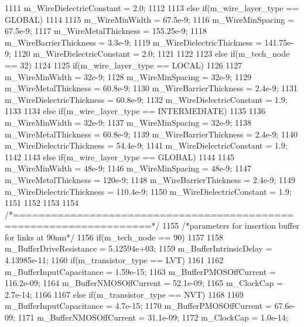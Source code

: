 \begin{DoxyCode}
{{{1111             m_WireDielectricConstant  = 2.0;
1112         }
1113         else if(m_wire_layer_type == GLOBAL)
1114         {
1115             m_WireMinWidth            = 67.5e-9;
1116             m_WireMinSpacing          = 67.5e-9;
1117             m_WireMetalThickness      = 155.25e-9;
1118             m_WireBarrierThickness    = 3.3e-9;
1119             m_WireDielectricThickness = 141.75e-9;
1120             m_WireDielectricConstant  = 2.0;
1121         }
1122     }
1123     else if(m_tech_node == 32)
1124     {
1125         if(m_wire_layer_type == LOCAL)
1126         {
1127             m_WireMinWidth            = 32e-9;
1128             m_WireMinSpacing          = 32e-9;
1129             m_WireMetalThickness      = 60.8e-9;
1130             m_WireBarrierThickness    = 2.4e-9;
1131             m_WireDielectricThickness = 60.8e-9;
1132             m_WireDielectricConstant  = 1.9;
1133         }
1134         else if(m_wire_layer_type == INTERMEDIATE)
1135         {
1136             m_WireMinWidth            = 32e-9;
1137             m_WireMinSpacing          = 32e-9;
1138             m_WireMetalThickness      = 60.8e-9;
1139             m_WireBarrierThickness    = 2.4e-9;
1140             m_WireDielectricThickness = 54.4e-9;
1141             m_WireDielectricConstant  = 1.9;
1142         }
1143         else if(m_wire_layer_type == GLOBAL)
1144         {
1145             m_WireMinWidth            = 48e-9;
1146             m_WireMinSpacing          = 48e-9;
1147             m_WireMetalThickness      = 120e-9;
1148             m_WireBarrierThickness    = 2.4e-9;
1149             m_WireDielectricThickness = 110.4e-9;
1150             m_WireDielectricConstant  = 1.9;
1151         }
1152     }
1153 
1154     /*===================================================================*/
1155     /*parameters for insertion buffer for links at 90nm*/
1156     if(m_tech_node == 90)
1157     {
1158         m_BufferDriveResistance     =  5.12594e+03;
1159         m_BufferIntrinsicDelay      =  4.13985e-11;
1160         if(m_transistor_type == LVT)
1161         {
1162             m_BufferInputCapacitance    =  1.59e-15;
1163             m_BufferPMOSOffCurrent      =  116.2e-09;
1164             m_BufferNMOSOffCurrent      =  52.1e-09;
1165             m_ClockCap                        = 2.7e-14;
1166         }
1167         else if(m_transistor_type == NVT)
1168         {
1169             m_BufferInputCapacitance    =  4.7e-15;
1170             m_BufferPMOSOffCurrent      =  67.6e-09;
1171             m_BufferNMOSOffCurrent      =  31.1e-09;
1172             m_ClockCap                  =  1.0e-14;
}}}
\end{DoxyCode}

